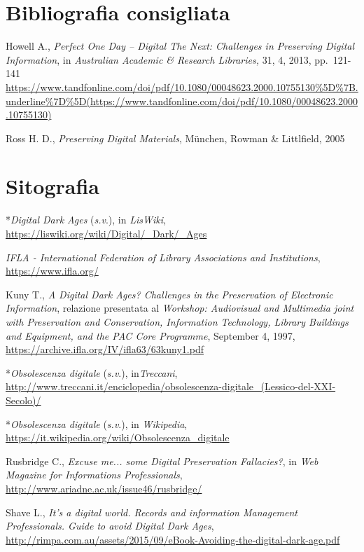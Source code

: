\documentclass[
  b5paper,
  twoside,
  12pt,
  chapterprefix=false,
  bibliography=totocnumbered,
  parskip=false]{scrbook}
\begin{document}
\hypertarget{bibliografia-consigliata-6}{%
\section*{Bibliografia consigliata}\label{bibliografia-consigliata-6}}

Howell A., \emph{Perfect One Day -- Digital The Next: Challenges in
Preserving Digital Information}, in \emph{Australian Academic \& Research
Libraries,} 31, 4, 2013, pp.~121-141
\url{https://www.tandfonline.com/doi/pdf/10.1080/00048623.2000.10755130\%5D\%7B.underline\%7D\%5D(https://www.tandfonline.com/doi/pdf/10.1080/00048623.2000.10755130)}

Ross H. D., \emph{Preserving Digital Materials}, München, Rowman \&
Littlfield, 2005

\hypertarget{sitografia-8}{%
\section*{Sitografia}\label{sitografia-8}}

*\emph{Digital Dark Ages} (\emph{s.v}.), in \emph{LisWiki},
\url{https://liswiki.org/wiki/Digital/_Dark/_Ages}

\emph{IFLA - International Federation of Library Associations and
Institutions},
\url{https://www.ifla.org/}

Kuny T., \emph{A Digital Dark Ages? Challenges in the Preservation of
Electronic Information}, relazione presentata al \emph{Workshop: Audiovisual
and Multimedia joint with Preservation and Conservation, Information
Technology, Library Buildings and Equipment, and the PAC Core
Programme}, September 4, 1997,
\url{https://archive.ifla.org/IV/ifla63/63kuny1.pdf}

*\emph{Obsolescenza digitale} (\emph{s.v}.), in\emph{Treccani},
\url{http://www.treccani.it/enciclopedia/obsolescenza-digitale_(Lessico-del-XXI-Secolo)/}

*\emph{Obsolescenza digitale} (\emph{s.v}.), in \emph{Wikipedia},
\url{https://it.wikipedia.org/wiki/Obsolescenza_digitale}

Rusbridge C., \emph{Excuse me... some Digital Preservation Fallacies?}, in
\emph{Web Magazine for Informations Professionals},
\url{http://www.ariadne.ac.uk/issue46/rusbridge/}

Shave L., \emph{It's a digital world. Records and information Management
Professionals. Guide to avoid Digital Dark Ages},
\url{http://rimpa.com.au/assets/2015/09/eBook-Avoiding-the-digital-dark-age.pdf}
\end{document}
